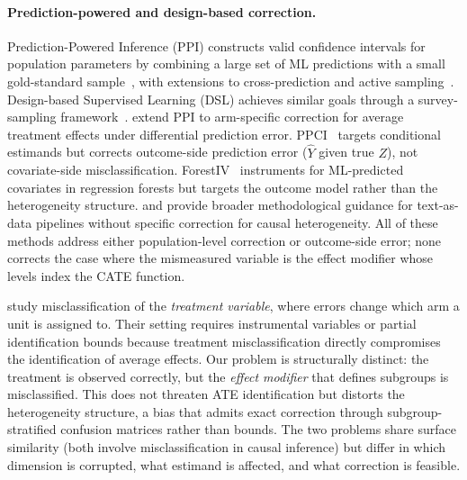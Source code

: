 \paragraph{Prediction-powered and design-based correction.}
Prediction-Powered Inference (PPI) constructs valid confidence intervals for population parameters by combining a large set of ML predictions with a small gold-standard sample~\cite{angelopoulos2023ppi}, with extensions to cross-prediction and active sampling~\cite{zrnic2024cross}.
Design-based Supervised Learning (DSL) achieves similar goals through a survey-sampling framework~\cite{egami2024dsl}.
\citet{mozer2026ppi} extend PPI to arm-specific correction for average treatment effects under differential prediction error.
PPCI~\cite{sui2026ppci} targets conditional estimands but corrects outcome-side prediction error ($\hat{Y}$ given true $Z$), not covariate-side misclassification.
ForestIV~\cite{bu2023forestiv} instruments for ML-predicted covariates in regression forests but targets the outcome model rather than the heterogeneity structure.
\citet{grimmer2022text} and \citet{audinet2025benchmarking} provide broader methodological guidance for text-as-data pipelines without specific correction for causal heterogeneity.
All of these methods address either population-level correction or outcome-side error; none corrects the case where the mismeasured variable is the effect modifier whose levels index the CATE function.

\citet{imai2010causal} study misclassification of the \textit{treatment variable}, where errors change which arm a unit is assigned to.
Their setting requires instrumental variables or partial identification bounds because treatment misclassification directly compromises the identification of average effects.
Our problem is structurally distinct: the treatment is observed correctly, but the \textit{effect modifier} that defines subgroups is misclassified.
This does not threaten ATE identification but distorts the heterogeneity structure, a bias that admits exact correction through subgroup-stratified confusion matrices rather than bounds.
The two problems share surface similarity (both involve misclassification in causal inference) but differ in which dimension is corrupted, what estimand is affected, and what correction is feasible.
